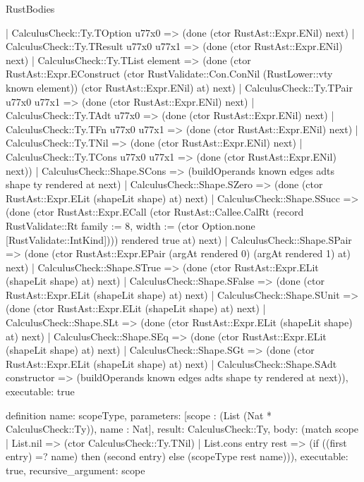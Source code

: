 \begin{lexlean}{RustBodies}
\begin{semanticmodule}
{      | CalculusCheck::Ty.TOption u77x0 => (done (ctor RustAst::Expr.ENil) next)
      | CalculusCheck::Ty.TResult u77x0 u77x1 => (done (ctor RustAst::Expr.ENil) next)
      | CalculusCheck::Ty.TList element => (done (ctor RustAst::Expr.EConstruct (ctor RustValidate::Con.ConNil (RustLower::vty known element)) (ctor RustAst::Expr.ENil) at) next)
      | CalculusCheck::Ty.TPair u77x0 u77x1 => (done (ctor RustAst::Expr.ENil) next)
      | CalculusCheck::Ty.TAdt u77x0 => (done (ctor RustAst::Expr.ENil) next)
      | CalculusCheck::Ty.TFn u77x0 u77x1 => (done (ctor RustAst::Expr.ENil) next)
      | CalculusCheck::Ty.TNil => (done (ctor RustAst::Expr.ENil) next)
      | CalculusCheck::Ty.TCons u77x0 u77x1 => (done (ctor RustAst::Expr.ENil) next))
    | CalculusCheck::Shape.SCons => (buildOperands known edges adts shape ty rendered at next)
    | CalculusCheck::Shape.SZero => (done (ctor RustAst::Expr.ELit (shapeLit shape) at) next)
    | CalculusCheck::Shape.SSucc => (done (ctor RustAst::Expr.ECall (ctor RustAst::Callee.CalRt (record RustValidate::Rt {family := 8, width := (ctor Option.none [RustValidate::IntKind])})) rendered true at) next)
    | CalculusCheck::Shape.SPair => (done (ctor RustAst::Expr.EPair (argAt rendered 0) (argAt rendered 1) at) next)
    | CalculusCheck::Shape.STrue => (done (ctor RustAst::Expr.ELit (shapeLit shape) at) next)
    | CalculusCheck::Shape.SFalse => (done (ctor RustAst::Expr.ELit (shapeLit shape) at) next)
    | CalculusCheck::Shape.SUnit => (done (ctor RustAst::Expr.ELit (shapeLit shape) at) next)
    | CalculusCheck::Shape.SLt => (done (ctor RustAst::Expr.ELit (shapeLit shape) at) next)
    | CalculusCheck::Shape.SEq => (done (ctor RustAst::Expr.ELit (shapeLit shape) at) next)
    | CalculusCheck::Shape.SGt => (done (ctor RustAst::Expr.ELit (shapeLit shape) at) next)
    | CalculusCheck::Shape.SAdt constructor => (buildOperands known edges adts shape ty rendered at next)),
  executable: true
}

definition{
  name: scopeType,
  parameters: [scope : (List (Nat * CalculusCheck::Ty)), name : Nat],
  result: CalculusCheck::Ty,
  body: (match scope
    | List.nil => (ctor CalculusCheck::Ty.TNil)
    | List.cons entry rest => (if ((first entry) =? name) then (second entry) else (scopeType rest name))),
  executable: true,
  recursive_argument: scope
}


\end{semanticmodule}
\end{lexlean}
